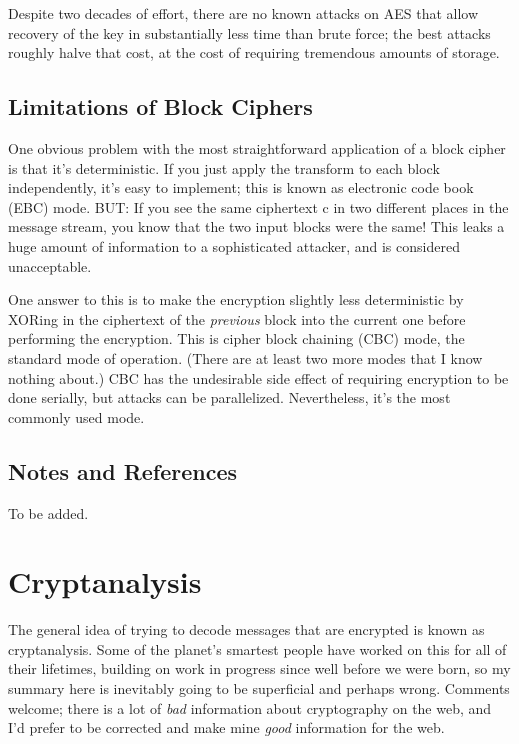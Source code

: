 \documentclass[%
 aip,
 jmp,%
 amsmath,amssymb,
 reprint,%
]{revtex4-1}
\begin{document}
Despite two decades of effort, there are no known attacks on AES that allow recovery of the key in substantially less time than brute force; the best attacks roughly halve that cost, at the cost of requiring tremendous amounts of storage.

\subsection{Limitations of Block Ciphers}

One obvious problem with the most straightforward application of a
block cipher is that it's deterministic.  If you just apply the
transform to each block independently, it's easy to implement; this is
known as electronic code book (EBC) mode.  BUT: If you see the same
ciphertext c in two different places in the message stream, you know
that the two input blocks were the same!  This leaks a huge amount of
information to a sophisticated attacker, and is considered
unacceptable.

One answer to this is to make the encryption slightly less
deterministic by XORing in the ciphertext of the \emph{previous} block into
the current one before performing the encryption.  This is cipher
block chaining (CBC) mode, the standard mode of operation.  (There are
at least two more modes that I know nothing about.)  CBC has the
undesirable side effect of requiring encryption to be done serially,
but attacks can be parallelized.  Nevertheless, it's the most commonly
used mode.

\subsection{Notes and References}

To be added.

\section{Cryptanalysis}

The general idea of trying to decode messages that are encrypted is
known as cryptanalysis.  Some of the planet's smartest people have
worked on this for all of their lifetimes, building on work in
progress since well before we were born, so my summary here is
inevitably going to be superficial and perhaps wrong.  Comments
welcome; there is a lot of \emph{bad} information about cryptography on the
web, and I'd prefer to be corrected and make mine \emph{good} information
for the web.
\end{document}

